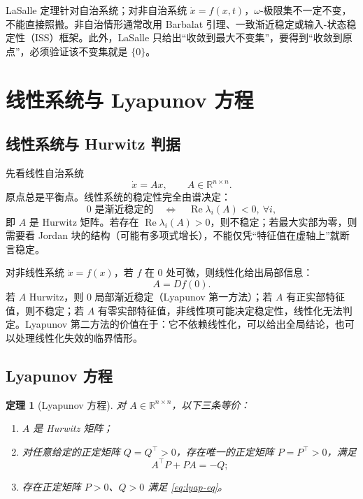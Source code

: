 \documentclass[11pt, a4paper, UTF8, fontset=none]{ctexart}
\theoremstyle{cnthm}
\newtheorem{theorem}{定理}[section]
\newcommand{\R}{\mathbb{R}}
\begin{document}
\begin{warnbox}
LaSalle 定理针对自治系统；对非自治系统 $\dot x=f(x,t)$，$\omega$-极限集不一定不变，不能直接照搬。非自治情形通常改用 Barbalat 引理、一致渐近稳定或输入-状态稳定性（ISS）框架。此外，LaSalle 只给出“收敛到最大不变集”，要得到“收敛到原点”，必须验证该不变集就是 $\{0\}$。
\end{warnbox}

\section{线性系统与 Lyapunov 方程}
\label{sec:linear}

\subsection{线性系统与 Hurwitz 判据}

先看线性自治系统
\begin{equation}
  \dot x=Ax,\qquad A\in\R^{n\times n}.
  \label{eq:linear}
\end{equation}
原点总是平衡点。线性系统的稳定性完全由谱决定：
\begin{equation}
  0\text{ 是渐近稳定的}\quad\Longleftrightarrow\quad \operatorname{Re}\lambda_i(A)<0,\ \forall i,
  \label{eq:hurwitz}
\end{equation}
即 $A$ 是 Hurwitz 矩阵。若存在 $\operatorname{Re}\lambda_i(A)>0$，则不稳定；若最大实部为零，则需要看 Jordan 块的结构（可能有多项式增长），不能仅凭“特征值在虚轴上”就断言稳定。

对非线性系统 $\dot x=f(x)$，若 $f$ 在 $0$ 处可微，则线性化给出局部信息：
\begin{equation}
  A=Df(0).
\end{equation}
若 $A$ Hurwitz，则 $0$ 局部渐近稳定（Lyapunov 第一方法）；若 $A$ 有正实部特征值，则不稳定；若 $A$ 有零实部特征值，非线性项可能决定稳定性，线性化无法判定。Lyapunov 第二方法的价值在于：它不依赖线性化，可以给出全局结论，也可以处理线性化失效的临界情形。

\subsection{Lyapunov 方程}

\begin{theorem}[Lyapunov 方程]
\label{thm:lyap}
对 $A\in\R^{n\times n}$，以下三条等价：
\begin{enumerate}[label=(\roman*)]
  \item $A$ 是 Hurwitz 矩阵；
  \item 对任意给定的正定矩阵 $Q=Q^\top>0$，存在唯一的正定矩阵 $P=P^\top>0$，满足
  \begin{equation}
    A^\top P+PA=-Q;
    \label{eq:lyap-eq}
  \end{equation}
  \item 存在正定矩阵 $P>0$、$Q>0$ 满足 \eqref{eq:lyap-eq}。
\end{enumerate}
\end{theorem}
\end{document}
